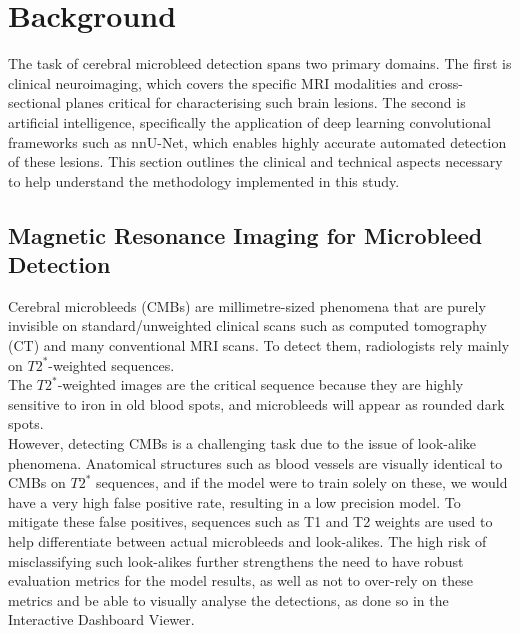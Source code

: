 \documentclass{aifyp}
\begin{document}
\pagebreak

\section{Background}
\label{s:background}

The task of cerebral microbleed detection spans two primary domains. The first is clinical neuroimaging, which covers the specific MRI modalities and cross-sectional planes critical for characterising such brain lesions. The second is artificial intelligence, specifically the application of deep learning convolutional frameworks such as nnU-Net, which enables highly accurate automated detection of these lesions. This section outlines the clinical and technical aspects necessary to help understand the methodology implemented in this study.

\subsection{Magnetic Resonance Imaging for Microbleed Detection}

Cerebral microbleeds (CMBs) are millimetre-sized phenomena that are purely invisible on standard/unweighted clinical scans such as computed tomography (CT) and many conventional MRI scans. To detect them, radiologists rely mainly on  $T2^*$-weighted sequences.\cite{cmbDetectPaper, valdoPaper}
\\

The $T2^*$-weighted images are the critical sequence because they are highly sensitive to iron in old blood spots, and microbleeds will appear as rounded dark spots.\cite{valdoPaper, cmbDetectPaper}
\\ 

However, detecting CMBs is a challenging task due to the issue of look-alike phenomena. Anatomical structures such as blood vessels are visually identical to CMBs on $T2^*$ sequences, and if the model were to train solely on these, we would have a very high false positive rate, resulting in a low precision model. To mitigate these false positives, sequences such as T1 and T2 weights are used to help differentiate between actual microbleeds and look-alikes. The high risk of misclassifying such look-alikes further strengthens the need to have robust evaluation metrics for the model results, as well as not to over-rely on these metrics and be able to visually analyse the detections, as done so in the Interactive Dashboard Viewer.\cite{cmbDetectPaper}
\end{document}
